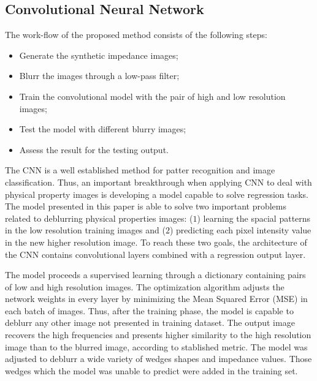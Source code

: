 \documentclass[conference,compsoc]{IEEEtran}
\begin{document}
\subsection{Convolutional Neural Network}
The work-flow of the proposed method consists of the following
steps:
\begin{itemize}
 \item Generate the synthetic impedance images;
 \item Blurr the images through a low-pass filter;
 \item Train the convolutional model with the pair of high and low resolution images;
 \item Test the model with different blurry images;
 \item Assess the result for the testing output.
\end{itemize}

The CNN is a well established method for
patter recognition and image classification.
Thus, an important breakthrough when applying CNN to
deal with physical property images is developing a model
capable to solve regression tasks. The model presented in this paper
is able to solve two important problems related to deblurring physical properties
images: ($1$) learning the spacial patterns in the low resolution
training images and ($2$) predicting each pixel intensity value in the new
higher resolution image. To reach these two goals, the architecture of the
CNN contains convolutional layers combined with a regression output
layer.

The model proceeds a supervised learning through a dictionary containing pairs of low
and high resolution images. The optimization algorithm adjusts the 
network weights in every layer by minimizing the Mean Squared Error (MSE)
in each batch of images. Thus, after the training phase, the model is capable
to deblurr any other image not presented in training dataset. The output
image recovers the high frequencies and presents higher similarity
to the high resolution image than to the blurred image, according to stablished metric.
The model was adjusted to deblurr a wide variety
of wedges shapes and impedance values. Those wedges which the model was unable
to predict were added in the training set.
\end{document}
